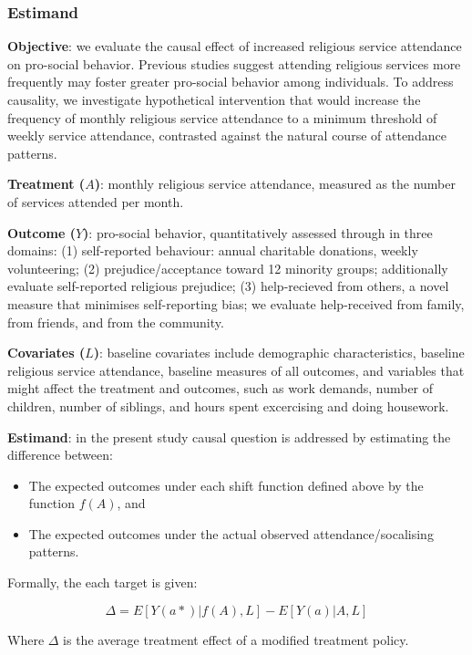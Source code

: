 \documentclass[
  singlecolumn]{article}
\providecommand{\tightlist}{%
  \setlength{\itemsep}{0pt}\setlength{\parskip}{0pt}}\usepackage{longtable,booktabs,array}
\begin{document}
\subsubsection{Estimand}\label{estimand}

\textbf{Objective}: we evaluate the causal effect of increased religious
service attendance on pro-social behavior. Previous studies suggest
attending religious services more frequently may foster greater
pro-social behavior among individuals. To address causality, we
investigate hypothetical intervention that would increase the frequency
of monthly religious service attendance to a minimum threshold of weekly
service attendance, contrasted against the natural course of attendance
patterns.

\textbf{Treatment (\(A\))}: monthly religious service attendance,
measured as the number of services attended per month.

\textbf{Outcome (\(Y\))}: pro-social behavior, quantitatively assessed
through in three domains: (1) self-reported behaviour: annual charitable
donations, weekly volunteering; (2) prejudice/acceptance toward 12
minority groups; additionally evaluate self-reported religious
prejudice; (3) help-recieved from others, a novel measure that minimises
self-reporting bias; we evaluate help-received from family, from
friends, and from the community.

\textbf{Covariates (\(L\))}: baseline covariates include demographic
characteristics, baseline religious service attendance, baseline
measures of all outcomes, and variables that might affect the treatment
and outcomes, such as work demands, number of children, number of
siblings, and hours spent excercising and doing housework.

\textbf{Estimand}: in the present study causal question is addressed by
estimating the difference between:

\begin{itemize}
\tightlist
\item
  The expected outcomes under each shift function defined above by the
  function \(f(A)\), and
\item
  The expected outcomes under the actual observed attendance/socalising
  patterns.
\end{itemize}

Formally, the each target is given:

\[ \Delta = E[Y(a*)|f(A),L] - E[Y(a)|A,L] \]

Where \(\Delta\) is the average treatment effect of a modified treatment
policy.
\end{document}
